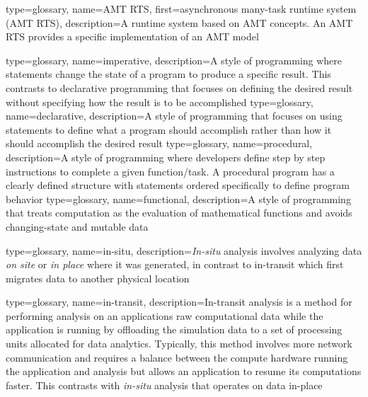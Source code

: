 {
  type=glossary,
  name={AMT RTS},
  first={asynchronous many-task runtime system (AMT RTS)},
  description={A runtime system based on \gls{AMT} concepts. An AMT RTS provides a specific implementation of an \gls{AMT model}}
}

{
  type=glossary,
  name={imperative},
  description={A style of programming where statements change the state of a program to produce a specific result. This contrasts to declarative programming that focuses on defining the desired result without specifying how the result is to be accomplished}
}
{
  type=glossary,
  name={declarative},
  description={A style of programming that focuses on using statements to define what a program should accomplish rather than how it should accomplish the desired result}
}
{
  type=glossary,
  name={procedural},
  description={A style of programming where developers define step by step instructions to complete a given function/task. A procedural program has a clearly defined structure with statements ordered specifically to define program behavior}
}
{
  type=glossary,
  name={functional},
  description={A style of programming that treats computation as the
    evaluation of mathematical functions and avoids changing-state and mutable
      data}
}


{
  type=glossary,
  name={in-situ},
  description={\textit{In-situ} analysis involves analyzing data \emph{on site} or \emph{in place} where it was generated, in contrast to \gls{in-transit} which first migrates data to another physical location}
}

{
  type=glossary,
  name={in-transit},
  description={In-transit analysis is a method for performing analysis on an applications raw computational data while the application is running by offloading the simulation data to a set of processing units allocated for data analytics. Typically, this method involves more network communication and requires a balance between the compute hardware running the application and analysis but allows an application to resume its computations faster. This contrasts with \textit{\gls{in-situ}} analysis that operates on data in-place}
}

